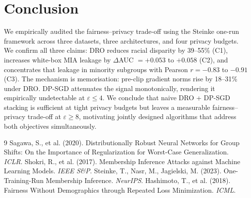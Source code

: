 \documentclass[11pt, a4paper]{article}
\begin{document}
\section{Conclusion}

We empirically audited the fairness--privacy trade-off using the Steinke one-run framework across three datasets, three architectures, and four privacy budgets. We confirm all three claims: DRO reduces racial disparity by 39--55\% (C1), increases white-box MIA leakage by $\Delta$AUC $= +0.053$ to $+0.058$ (C2), and concentrates that leakage in minority subgroups with Pearson $r = -0.83$ to $-0.91$ (C3). The mechanism is memorisation: pre-clip gradient norms rise by 18--31\% under DRO. DP-SGD attenuates the signal monotonically, rendering it empirically undetectable at $\varepsilon \le 4$. We conclude that naive DRO + DP-SGD stacking is sufficient at tight privacy budgets but leaves a measurable fairness--privacy trade-off at $\varepsilon \ge 8$, motivating jointly designed algorithms that address both objectives simultaneously.


\begin{thebibliography}{9}
 Sagawa, S., et al. (2020). Distributionally Robust Neural Networks for Group Shifts: On the Importance of Regularization for Worst-Case Generalization. \textit{ICLR}.
 Shokri, R., et al. (2017). Membership Inference Attacks against Machine Learning Models. \textit{IEEE S\&P}.
 Steinke, T., Nasr, M., Jagielski, M. (2023). One-Training-Run Membership Inference. \textit{NeurIPS}.
 Hashimoto, T., et al. (2018). Fairness Without Demographics through Repeated Loss Minimization. \textit{ICML}.
\end{thebibliography}
\end{document}
